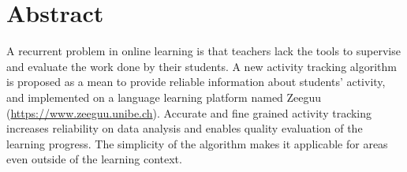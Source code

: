 \begingroup
\let\clearpage\relax
\let\cleardoublepage\relax
\let\cleardoublepage\relax

\chapter*{Abstract}
A recurrent problem in online learning is that teachers lack the tools to supervise and evaluate the work done by their students. A new activity tracking algorithm is proposed as a mean to provide reliable information about students' activity, and implemented on a language learning platform named Zeeguu (\url{https://www.zeeguu.unibe.ch}). Accurate and fine grained activity tracking increases reliability on data analysis and enables quality evaluation of the learning progress. The simplicity of the algorithm makes it applicable for areas even outside of the learning context.




\vfill
%

\endgroup

\vfill
